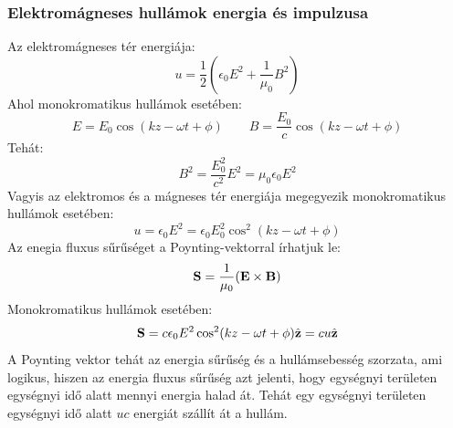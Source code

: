 \documentclass[a4paper,12pt]{article}
\begin{document}
\subsubsection{Elektromágneses hullámok energia és impulzusa}
Az elektromágneses tér energiája:
\begin{equation}
    u = \frac{1}{2} \left( \epsilon_0 E^2 + \frac{1}{\mu_0} B^2 \right)
\end{equation}
Ahol monokromatikus hullámok esetében:
\begin{equation}
    E = E_0 \cos(kz - \omega t + \phi) \qquad B = \frac{E_0}{c} \cos(kz - \omega t + \phi)
\end{equation}
Tehát:
\begin{equation}
    B^2 = \frac{E_0^2}{c^2} E^2 = \mu_0 \epsilon_0 E^2
\end{equation}
Vagyis az elektromos és a mágneses tér energiája megegyezik monokromatikus hullámok esetében:
\begin{equation}
    u = \epsilon_0 E^2 = \epsilon_0 E_0^2 \cos^2(kz - \omega t + \phi)
\end{equation}
Az enegia fluxus sűrűséget a Poynting-vektorral írhatjuk le:
\begin{equation}
    \bold{S} = \frac{1}{\mu_0} (\bold{E} \times \bold{B})
\end{equation}
Monokromatikus hullámok esetében:
\begin{equation}
    \bold{S} = c\epsilon_0 E^2 \cos^2(kz - \omega t + \phi) \hat{\bold{z}} = cu \hat{\bold{z}}
\end{equation}
A Poynting vektor tehát az energia sűrűség és a hullámsebesség szorzata, ami logikus, hiszen az energia fluxus sűrűség azt jelenti, hogy egységnyi területen egységnyi idő alatt mennyi energia halad át.
Tehát egy egységnyi területen egységnyi idő alatt $uc$ energiát szállít át a hullám.
\end{document}
